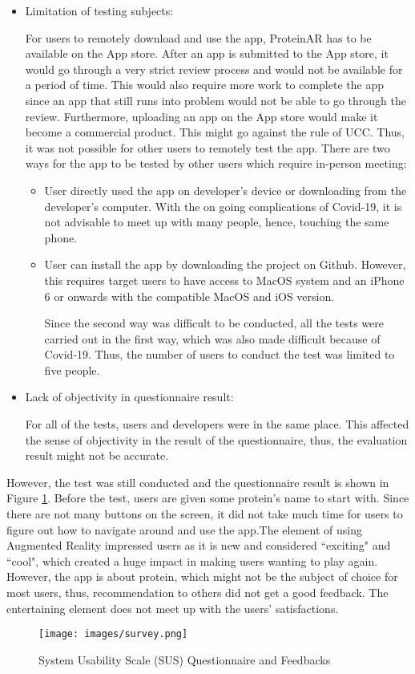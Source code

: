 \begin{itemize}
\item Limitation of testing subjects: 

For users to remotely download and use the app, ProteinAR has to be available on the App store. After an app is submitted to the App store, it would go through a very strict review process and would not be available for a period of time. This would also require more work to complete the app since an app that still runs into problem would not be able to go through the review. Furthermore, uploading an app on the App store would make it become a commercial product. This might go against the rule of UCC. Thus, it was not possible for other users to remotely test the app. There are two ways for the app to be tested by other users which require in-person meeting:
	\begin{itemize}
		\item User directly used the app on developer's device or downloading from the developer's computer. With the on going complications of Covid-19, it is not advisable to meet up with many people, hence, touching the same phone. 
		\item User can install the app by downloading the project on Github. However, this requires target users to have access to MacOS system and an iPhone 6 or onwards with the compatible MacOS and iOS version.

Since the second way was difficult to be conducted, all the tests were carried out in the first way, which was also made difficult because of Covid-19. Thus, the number of users to conduct the test was limited to five people.
	\end{itemize}
\item Lack of objectivity in questionnaire result:

For all of the tests, users and developers were in the same place. This affected the sense of objectivity in the result of the questionnaire, thus, the evaluation result might not be accurate. 
\end{itemize}

However, the test was still conducted and the questionnaire result is shown in Figure \ref{fig:survey}. Before the test, users are given some protein's name to start with. Since there are not many buttons on the screen, it did not take much time for users to figure out how to navigate around and use the app.The element of using Augmented Reality impressed users as it is new and considered ``exciting" and ``cool", which created a huge impact in making users wanting to play again. However, the app is about protein, which might not be the subject of choice for most users, thus, recommendation to others did not get a good feedback. The entertaining element does not meet up with the users' satisfactions.
 \begin{figure}[!htp]
	\centering
	\texttt{[image: images/survey.png]}
	\caption{System Usability Scale (SUS) Questionnaire and Feedbacks}
	\label{fig:survey}
\end{figure}

